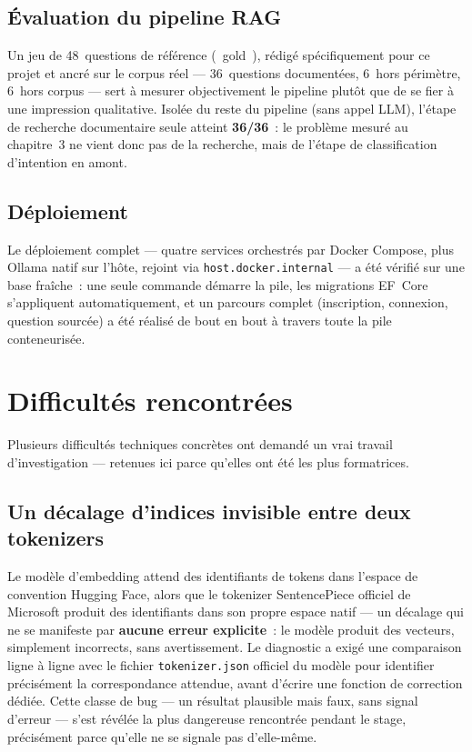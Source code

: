 \documentclass[12pt,a4paper]{article}
\newcommand{\code}[1]{\texttt{\small #1}}
\begin{document}
\subsection{\'Evaluation du pipeline RAG}

Un jeu de 48~questions de r\'ef\'erence (\guillemotleft~gold~\guillemotright), r\'edig\'e sp\'ecifiquement pour ce projet et ancr\'e sur le corpus r\'eel --- 36~questions document\'ees, 6~hors p\'erim\`etre, 6~hors corpus --- sert \`a mesurer objectivement le pipeline plut\^ot que de se fier \`a une impression qualitative. Isol\'ee du reste du pipeline (sans appel LLM), l'\'etape de recherche documentaire seule atteint \textbf{36/36}~: le probl\`eme mesur\'e au chapitre~3 ne vient donc pas de la recherche, mais de l'\'etape de classification d'intention en amont.

\subsection{D\'eploiement}

Le d\'eploiement complet --- quatre services orchestr\'es par Docker Compose, plus Ollama natif sur l'h\^ote, rejoint via \code{host.docker.internal} --- a \'et\'e v\'erifi\'e sur une base fra\^iche~: une seule commande d\'emarre la pile, les migrations EF~Core s'appliquent automatiquement, et un parcours complet (inscription, connexion, question sourc\'ee) a \'et\'e r\'ealis\'e de bout en bout \`a travers toute la pile conteneuris\'ee.

\newpage
\section{Difficult\'es rencontr\'ees}

Plusieurs difficult\'es techniques concr\`etes ont demand\'e un vrai travail d'investigation --- retenues ici parce qu'elles ont \'et\'e les plus formatrices.

\subsection{Un d\'ecalage d'indices invisible entre deux tokenizers}

Le mod\`ele d'embedding attend des identifiants de tokens dans l'espace de convention Hugging Face, alors que le tokenizer SentencePiece officiel de Microsoft produit des identifiants dans son propre espace natif --- un d\'ecalage qui ne se manifeste par \textbf{aucune erreur explicite}~: le mod\`ele produit des vecteurs, simplement incorrects, sans avertissement. Le diagnostic a exig\'e une comparaison ligne \`a ligne avec le fichier \code{tokenizer.json} officiel du mod\`ele pour identifier pr\'ecis\'ement la correspondance attendue, avant d'\'ecrire une fonction de correction d\'edi\'ee. Cette classe de bug --- un r\'esultat plausible mais faux, sans signal d'erreur --- s'est r\'ev\'el\'ee la plus dangereuse rencontr\'ee pendant le stage, pr\'ecis\'ement parce qu'elle ne se signale pas d'elle-m\^eme.
\end{document}
